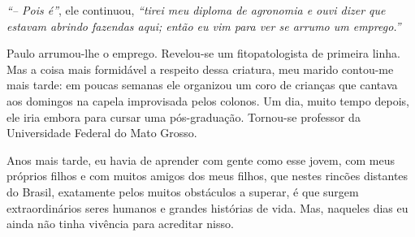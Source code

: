 \textit{``-- Pois é''}, ele continuou, \textit{``tirei meu diploma de agronomia e ouvi dizer que estavam abrindo fazendas aqui; então eu vim para ver se arrumo um emprego.''}

Paulo arrumou-lhe o emprego.
Revelou-se um fitopatologista de primeira linha.
Mas a coisa mais formidável a respeito dessa criatura, meu marido contou-me mais tarde: em poucas semanas ele organizou um coro de crianças que cantava aos domingos na capela improvisada pelos colonos.
Um dia, muito tempo depois, ele iria embora para cursar uma pós-graduação.
Tornou-se professor da Universidade Federal do Mato Grosso.


Anos mais tarde, eu havia de aprender com gente como esse jovem, com meus próprios filhos e com muitos amigos dos meus filhos, que nestes rincões distantes do Brasil, exatamente pelos muitos obstáculos a superar, é que surgem extraordinários seres humanos e grandes histórias de vida.
 Mas, naqueles dias eu ainda não tinha vivência para acreditar nisso.

